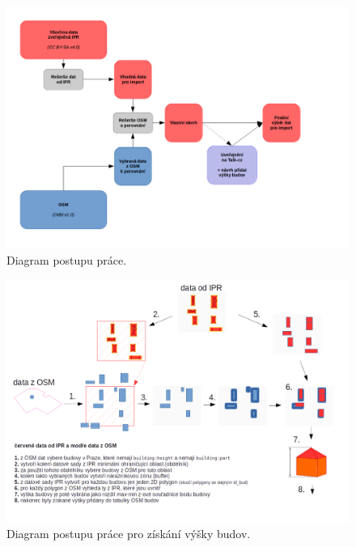 \begin{figure}[H]
  \centering
  \includegraphics[scale=0.70,angle=90]{pictures/WorkFlow.png}
  \caption{Diagram postupu práce.}
  \label{fig:diagram_workflow}
\end{figure}

\begin{figure}[H]
  \centering
  \includegraphics[scale=0.70,angle=90]{pictures/diagram_building_height.png}
  \caption{Diagram postupu práce pro získání výšky budov.}
  \label{fig:diagram_building}
\end{figure}


